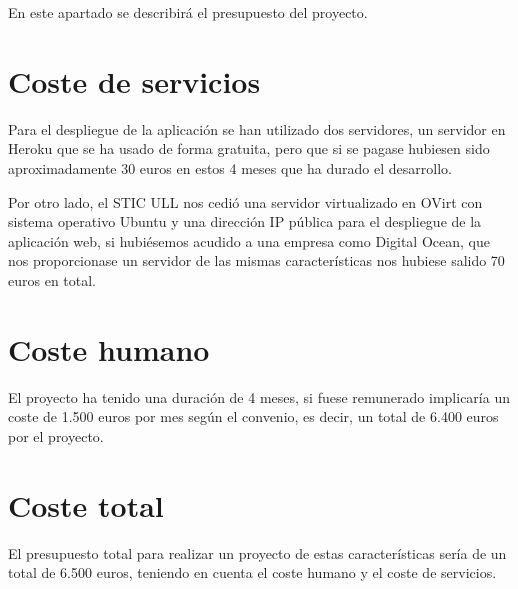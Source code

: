 

En este apartado se describirá el presupuesto del proyecto.

\section{Coste de servicios}
\label{7:sec:1}

Para el despliegue de la aplicación se han utilizado dos servidores, un servidor en Heroku que se ha usado de forma gratuita, pero que si se pagase hubiesen sido aproximadamente 30 euros en estos 4 meses que ha durado el desarrollo.

Por otro lado, el STIC ULL nos cedió una servidor virtualizado en OVirt con sistema operativo Ubuntu y una dirección IP pública para el despliegue de la aplicación web, si hubiésemos acudido a una empresa como Digital Ocean, que nos proporcionase un servidor de las mismas características nos hubiese salido 70 euros en total.

\section{Coste humano}
\label{7:sec:2}

El proyecto ha tenido una duración de 4 meses, si fuese remunerado implicaría un coste de 1.500 euros por mes según el convenio, es decir, un total de 6.400 euros por el proyecto.

\section{Coste total}
\label{7:sec:3}

El presupuesto total para realizar un proyecto de estas características sería de un total de 6.500 euros, teniendo en cuenta el coste humano y el coste de servicios.
